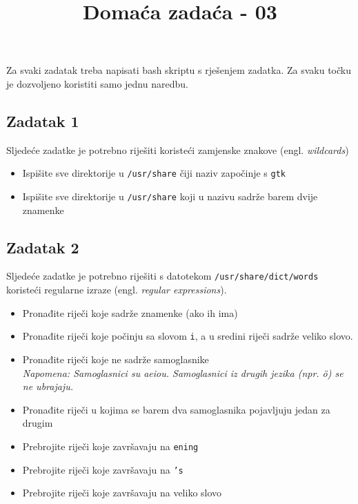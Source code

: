 \documentclass[12pt,a4paper]{article}
\newcommand{\shell}[1]{\texttt{#1}}
\begin{document}
	\title{Domaća zadaća - 03\vspace{-2em}}
	\maketitle
	Za svaki zadatak treba napisati bash skriptu s rješenjem zadatka. Za svaku točku je dozvoljeno koristiti samo jednu naredbu.
	
	\subsection*{Zadatak 1}
	Sljedeće zadatke je potrebno riješiti koristeći zamjenske znakove (engl. \emph{wildcards})
	\begin{itemize}	
		\item Ispišite sve direktorije u \shell{/usr/share} čiji naziv započinje s \shell{gtk}
		\item Ispišite sve direktorije u \shell{/usr/share} koji u nazivu sadrže barem dvije znamenke
	\end{itemize}
	
	\subsection*{Zadatak 2}
	Sljedeće zadatke je potrebno riješiti s datotekom \shell{/usr/share/dict/words} koristeći regularne izraze (engl. \emph{regular expressions}).
	\begin{itemize}
		\item Pronađite riječi koje sadrže znamenke (ako ih ima)
		\item Pronađite riječi koje počinju sa slovom \shell{i}, a u sredini riječi sadrže veliko slovo.
		\item Pronađite riječi koje ne sadrže samoglasnike \\ \emph{Napomena: Samoglasnici su aeiou. Samoglasnici iz drugih jezika (npr. ö) se ne ubrajaju.}
		\item Pronađite riječi u kojima se barem dva samoglasnika pojavljuju jedan za drugim
		\item Prebrojite riječi koje završavaju na \shell{ening}
		\item Prebrojite riječi koje završavaju na \shell{'s}
		\item Prebrojite riječi koje završavaju na veliko slovo
	\end{itemize}
	
\end{document}
